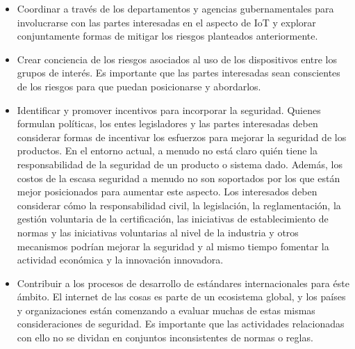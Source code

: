 \begin{itemize}
\item Coordinar a través de los departamentos y agencias gubernamentales para involucrarse con las partes interesadas en el aspecto de IoT y explorar conjuntamente formas de mitigar los riesgos planteados anteriormente.
\item Crear conciencia de los riesgos asociados al uso de los dispositivos entre los grupos de interés. Es importante que las partes interesadas sean conscientes de los riesgos para que puedan posicionarse y  abordarlos.
\item Identificar y promover incentivos para incorporar la seguridad. Quienes formulan políticas, los entes legisladores y las partes interesadas deben considerar formas de incentivar los esfuerzos para mejorar la seguridad de los productos. En el entorno actual, a menudo no está claro quién tiene la responsabilidad de la seguridad de un producto o sistema dado. Además, los costos de la escasa seguridad a menudo no son soportados por los que están mejor posicionados para aumentar este aspecto.  Los interesados deben considerar cómo la responsabilidad civil, la legislación, la reglamentación, la gestión voluntaria de la certificación, las iniciativas de establecimiento de normas y las iniciativas voluntarias al nivel de la industria y otros mecanismos podrían mejorar la seguridad y al mismo tiempo fomentar la actividad económica y la innovación innovadora.
\item Contribuir a los procesos de desarrollo de estándares internacionales para éste ámbito. El internet de las cosas es parte de un ecosistema global, y los países y organizaciones están comenzando a evaluar muchas de estas mismas consideraciones de seguridad. Es importante que las actividades relacionadas con ello no se dividan en conjuntos inconsistentes de normas o reglas. 
\end{itemize}
